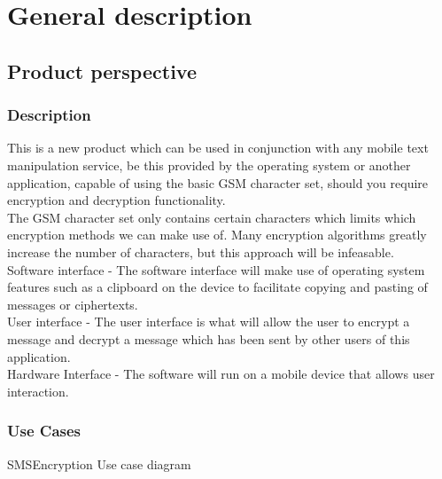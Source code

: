 \section{General description}

\subsection{Product perspective}

\subsubsection{Description}
This is a new product which can be used in conjunction with any mobile text manipulation service, be this provided by the operating system or another application, capable of using the basic GSM character set, should you require encryption and decryption functionality.
\vspace{12pt}\\
The GSM character set only contains certain characters which limits which encryption methods we can make use of. Many encryption algorithms greatly increase the number of characters, but this approach will be infeasable.
\vspace{12pt}\\
Software interface - The software interface will make use of operating system features such as a clipboard on the device to facilitate copying and pasting of messages or ciphertexts.
\vspace{12pt}\\
User interface - The user interface is what will allow the user to encrypt a message and decrypt a message which has been sent by other users of this application.
\vspace{12pt}\\
Hardware Interface - The software will run on a mobile device that allows user interaction.


\newpage
\subsubsection{Use Cases}
SMSEncryption Use case diagram

